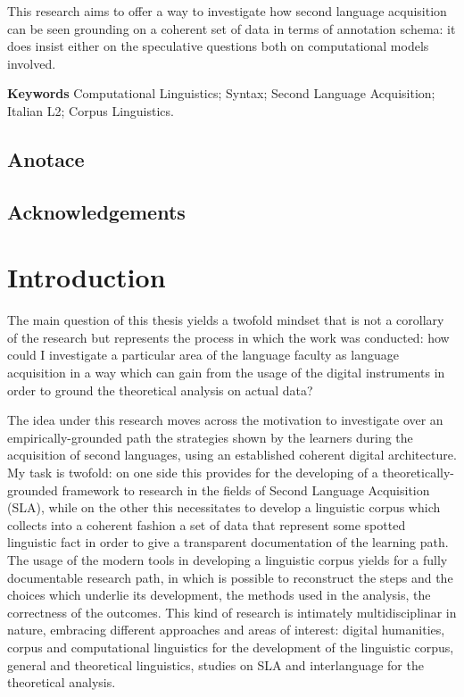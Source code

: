 \documentclass[
  a4paper,
  twoside,
  12pt,
  chapterprefix=false,
  bibliography=totocnumbered,
  listof=flat]{scrbook}
\begin{document}
This research aims to offer a way to investigate how second language acquisition can be seen grounding on a coherent set of data in terms of annotation schema: it does insist either on the speculative questions both on computational models involved.

\textbf{Keywords}
Computational Linguistics; Syntax; Second Language Acquisition; Italian L2; Corpus Linguistics.

\newpage

\hypertarget{anotace}{%
\section*{Anotace}\label{anotace}}

\newpage

\hypertarget{acknowledgements}{%
\section*{Acknowledgements}\label{acknowledgements}}

\mainmatter

\hypertarget{introduction}{%
\chapter{Introduction}\label{introduction}}

The main question of this thesis yields a twofold mindset that is not a corollary of the research but represents the process in which the work was conducted: how could I investigate a particular area of the language faculty as language acquisition in a way which can gain from the usage of the digital instruments in order to ground the theoretical analysis on actual data?

The idea under this research moves across the motivation to investigate over an empirically-grounded path the strategies shown by the learners during the acquisition of second languages, using an established coherent digital architecture.
My task is twofold: on one side this provides for the developing of a theoretically-grounded framework to research in the fields of Second Language Acquisition (SLA), while on the other this necessitates to develop a linguistic corpus which collects into a coherent fashion a set of data that represent some spotted linguistic fact in order to give a transparent documentation of the learning path.
The usage of the modern tools in developing a linguistic corpus yields for a fully documentable research path, in which is possible to reconstruct the steps and the choices which underlie its development, the methods used in the analysis, the correctness of the outcomes.
This kind of research is intimately multidisciplinar in nature, embracing different approaches and areas of interest: digital humanities, corpus and computational linguistics for the development of the linguistic corpus, general and theoretical linguistics, studies on SLA and interlanguage for the theoretical analysis.
\end{document}
